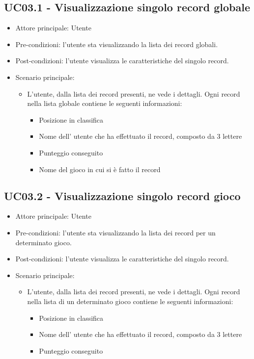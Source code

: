 \subsection{UC03.1 - Visualizzazione singolo record globale}
\begin{itemize}
    \item Attore principale: Utente
    \item Pre-condizioni: l'utente sta visualizzando la lista dei record globali.
    \item Post-condizioni: l'utente visualizza le caratteristiche del singolo record.
    \item Scenario principale: \begin{itemize}
        \item L'utente, dalla lista dei record presenti, ne vede i dettagli. Ogni record nella lista globale contiene le seguenti informazioni: \begin{itemize}
            \item Posizione in classifica
            \item Nome dell' utente che ha effettuato il record, composto da 3 lettere
            \item Punteggio conseguito
            \item Nome del gioco in cui si è fatto il record
        \end{itemize}
    \end{itemize}
\end{itemize}

\subsection{UC03.2 - Visualizzazione singolo record gioco}
\begin{itemize}
    \item Attore principale: Utente
    \item Pre-condizioni: l'utente sta visualizzando la lista dei record per un determinato gioco.
    \item Post-condizioni: l'utente visualizza le caratteristiche del singolo record.
    \item Scenario principale: \begin{itemize}
        \item L'utente, dalla lista dei record presenti, ne vede i dettagli. Ogni record nella lista di un determinato gioco contiene le seguenti informazioni: \begin{itemize}
            \item Posizione in classifica
            \item Nome dell' utente che ha effettuato il record, composto da 3 lettere
            \item Punteggio conseguito
        \end{itemize}
    \end{itemize}
\end{itemize}

